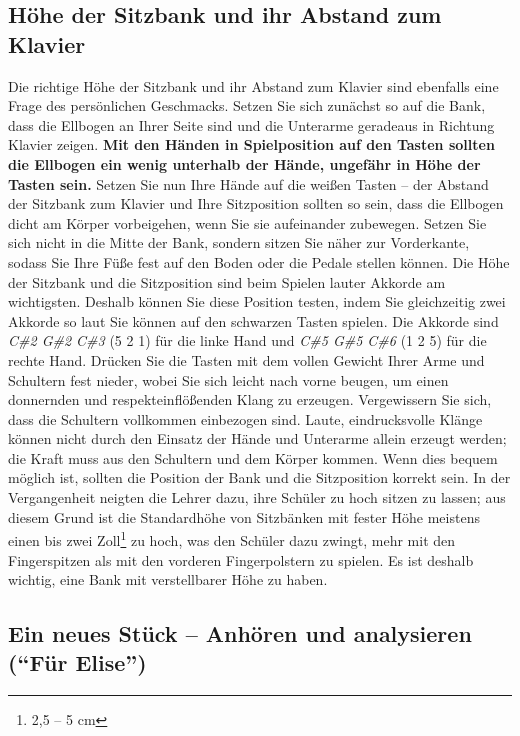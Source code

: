 \subsection{Höhe der Sitzbank und ihr Abstand zum Klavier}
\label{c1ii3}

Die richtige Höhe der Sitzbank und ihr Abstand zum Klavier sind ebenfalls eine Frage des persönlichen Geschmacks.
Setzen Sie sich zunächst so auf die Bank, dass die Ellbogen an Ihrer Seite sind und die Unterarme geradeaus in Richtung Klavier zeigen.
\textbf{Mit den Händen in Spielposition auf den Tasten sollten die Ellbogen ein wenig unterhalb der Hände, ungefähr in Höhe der Tasten sein.}
Setzen Sie nun Ihre Hände auf die weißen Tasten -- der Abstand der Sitzbank zum Klavier und Ihre Sitzposition sollten so sein, dass die Ellbogen dicht am Körper vorbeigehen, wenn Sie sie aufeinander zubewegen.
Setzen Sie sich nicht in die Mitte der Bank, sondern sitzen Sie näher zur Vorderkante, sodass Sie Ihre Füße fest auf den Boden oder die Pedale stellen können.
Die Höhe der Sitzbank und die Sitzposition sind beim Spielen lauter Akkorde am wichtigsten.
Deshalb können Sie diese Position testen, indem Sie gleichzeitig zwei Akkorde so laut Sie können auf den schwarzen Tasten spielen.
Die Akkorde sind \textit{C\#2 G\#2 C\#3} (5 2 1) für die linke Hand und \textit{C\#5 G\#5 C\#6} (1 2 5) für die rechte Hand.
Drücken Sie die Tasten mit dem vollen Gewicht Ihrer Arme und Schultern fest nieder, wobei Sie sich leicht nach vorne beugen, um einen donnernden und respekteinflößenden Klang zu erzeugen.
Vergewissern Sie sich, dass die Schultern vollkommen einbezogen sind.
Laute, eindrucksvolle Klänge können nicht durch den Einsatz der Hände und Unterarme allein erzeugt werden; die Kraft muss aus den Schultern und dem Körper kommen.
Wenn dies bequem möglich ist, sollten die Position der Bank und die Sitzposition korrekt sein.
In der Vergangenheit neigten die Lehrer dazu, ihre Schüler zu hoch sitzen zu lassen;
aus diesem Grund ist die Standardhöhe von Sitzbänken mit fester Höhe meistens einen bis zwei Zoll\footnote{2,5 -- 5 cm} zu hoch, was den Schüler dazu zwingt, mehr mit den Fingerspitzen als mit den vorderen Fingerpolstern zu spielen.
Es ist deshalb wichtig, eine Bank mit verstellbarer Höhe zu haben.


\subsection{Ein neues Stück -- Anhören und analysieren (\enquote{Für Elise})}
\label{c1ii4}

